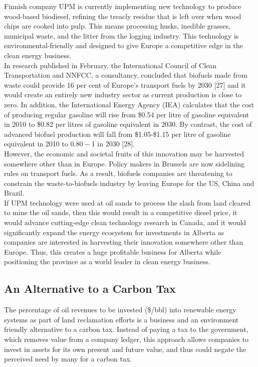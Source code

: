 \documentclass[11pt]{article}
\begin{document}
Finnish company UPM is currently implementing new technology to produce wood-based biodiesel, refining the treacly residue that is left over when wood chips are cooked into pulp. This means processing husks, inedible grasses, municipal waste, and the litter from the logging industry. This technology is environmental-friendly and designed to give Europe a competitive edge in the clean energy business. \\

In research published in February, the International Council of Clean Transportation and NNFCC, a consultancy, concluded that biofuels made from waste could provide 16 per cent of Europe’s transport fuels by 2030 [27] and it would create an entirely new industry sector as current production is close to zero. In addition, the International Energy Agency (IEA) calculates that the cost of producing regular gasoline will rise from \$0.54 per litre of gasoline equivalent in 2010 to \$0.82 per litres of gasoline equivalent in 2030. By contrast, the cost of advanced biofuel production will fall from \$1.05-\$1.15 per litre of gasoline equivalent in 2010 to $0.80-$1 in 2030 [28].\\

However, the economic and societal fruits of this innovation may be harvested somewhere other than in Europe. Policy makers in Brussels are now sidelining rules on transport fuels. As a result, biofuels companies are threatening to constrain the waste-to-biofuels industry by leaving Europe for the US, China and Brazil.  \\

If UPM technology were used at oil sands to process the slash from land cleared to mine the oil sands, then this would result in a competitive diesel price, it would advance cutting-edge clean technology research in Canada, and it would significantly expand the energy ecosystem for investments in Alberta as companies are interested in harvesting their innovation somewhere other than Europe. Thus, this creates a huge profitable business for Alberta while positioning the province as a world leader in clean energy business.  


\subsection{An Alternative to a Carbon Tax}

The percentage of oil revenues to be invested (\$/bbl) into renewable energy systems as part of land reclamation efforts is a business and an environment friendly alternative to a carbon tax. Instead of paying a tax to the government, which removes value from a company ledger, this approach allows companies to invest in assets for its own present and future value, and thus could negate the perceived need by many for a carbon tax. \\
\end{document}
